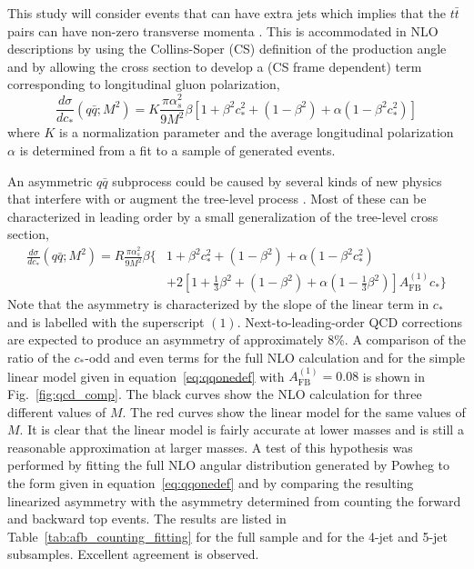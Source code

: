 This study will consider events that can have extra jets which implies that the $t\bar t$ pairs can have non-zero transverse momenta .  This is accommodated in NLO descriptions by using the Collins-Soper (CS) definition \cite{Collins:1977iv} of the production angle and by allowing the cross section to develop a (CS frame dependent) term corresponding to longitudinal gluon polarization,
\begin{equation}
\frac{d\sigma}{dc_*}(q\bar q;M^2) = K\frac{\pi\alpha_s^2}{9M^2}\beta\left[1+\beta^2c_*^2+\left(1-\beta^2\right)+\alpha\left(1-\beta^2c_*^2\right)\right]
\label{eq:qqnlodef}
\end{equation}
where $K$ is a normalization parameter and the average longitudinal polarization $\alpha$ is determined from a fit to a sample of generated events.

An asymmetric $q\bar q$ subprocess could be caused by several kinds of new physics that interfere with or augment the tree-level process   \cite{Cao:2010zb, Gresham:2011pa}.  Most of these can be characterized in leading order by a small generalization of the tree-level cross section,
\begin{align}
\frac{d\sigma}{dc_*}(q\bar q;M^2) = R\frac{\pi\alpha_s^2}{9M^2}\beta\biggl\lbrace&1+\beta^2c_*^2+\left(1-\beta^2\right)+\alpha \left(1-\beta^2c_*^2\right) \nonumber \\
&+2\left[1+\frac{1}{3}\beta^2+(1-\beta^2)+\alpha\left(1-\frac{1}{3}\beta^2\right)\right]A_\mathrm{FB}^{(1)}c_*\biggr\rbrace
\label{eq:qqonedef}
\end{align}
Note that the asymmetry is characterized by the slope of the linear term in $c_*$ and is labelled with the superscript $(1)$.  Next-to-leading-order QCD corrections are expected  \cite{Kuhn:1998kw} to produce an asymmetry of approximately 8\%.  A comparison of the ratio of the $c_*$-odd and even terms for the full NLO calculation and for the simple linear model given in equation~\ref{eq:qqonedef} with $A_\mathrm{FB}^{(1)} = 0.08$ is shown in Fig.~\ref{fig:qcd_comp}.  The black curves show the NLO calculation for three different values of $M$.  The red curves show the linear model for the same values of $M$.  It is clear that the linear model is fairly accurate at lower masses and is still a reasonable approximation at larger masses.  A test of this hypothesis was performed by fitting the full NLO angular distribution generated by Powheg to the form given in equation~\ref{eq:qqonedef} and by comparing the resulting linearized asymmetry with the asymmetry determined from counting the forward and backward top events.  The results are listed in Table~\ref{tab:afb_counting_fitting} for the full sample and for the 4-jet and 5-jet subsamples.  Excellent agreement is observed.
